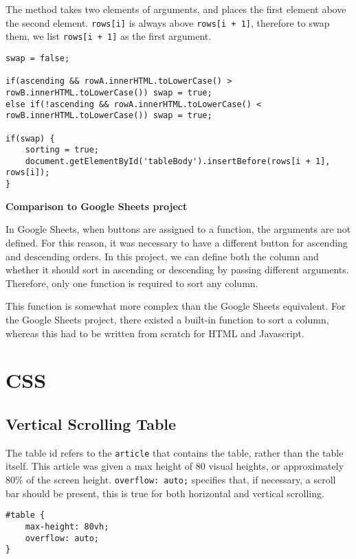 \documentclass[letterpaper]{article}
\begin{document}
The method takes two elements of arguments, and places the first element above the second element.
\lstinline{rows[i]} is always above \lstinline{rows[i + 1]}, therefore to swap them, we list \lstinline{rows[i + 1]} as the first argument.

\begin{lstlisting}[firstnumber=232]
swap = false;

if(ascending && rowA.innerHTML.toLowerCase() > rowB.innerHTML.toLowerCase()) swap = true;
else if(!ascending && rowA.innerHTML.toLowerCase() < rowB.innerHTML.toLowerCase()) swap = true;

if(swap) {
    sorting = true;
    document.getElementById('tableBody').insertBefore(rows[i + 1], rows[i]);
}
\end{lstlisting}

\textbf{Comparison to Google Sheets project}

In Google Sheets, when buttons are assigned to a function, the arguments are not defined.
For this reason, it was necessary to have a different button for ascending and descending orders.
In this project, we can define both the column and whether it should sort in ascending or descending by passing different arguments.
Therefore, only one function is required to sort any column.

This function is somewhat more complex than the Google Sheets equivalent.
For the Google Sheets project, there existed a built-in function to sort a column, whereas this had to be written from scratch for HTML and Javascript.

\newpage

\section{CSS}\label{CSS}

\subsection{Vertical Scrolling Table}

The table id refers to the \lstinline{article} that contains the table, rather than the table itself.
This article was given a max height of 80 visual heights, or approximately 80\% of the screen height.
\lstinline{overflow: auto;} specifies that, if necessary, a scroll bar should be present, this is true for both horizontal and vertical scrolling.

\begin{lstlisting}[firstnumber=29]
#table {
    max-height: 80vh;
    overflow: auto;
}
\end{lstlisting}
\end{document}
